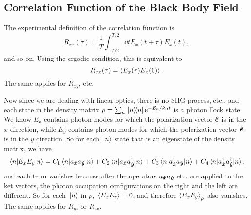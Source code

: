 \documentclass[hyperref, a4paper]{article}
\newcommand*{\ee}{\mathrm{e}}
\newcommand{\kB}{k_{\text{B}}}
\begin{document}
\subsection{Correlation Function of the Black Body Field}

The experimental definition of the correlation function is 
\begin{equation}
    R_{xx}(\tau) = \frac{1}{T} \int_{-T/2}^{T/2} \dd{t} E_x(t+\tau) E_x(t),
\end{equation}
and so on. 
Using the ergodic condition, this is equivalent to 
\begin{equation}
    R_{xx} (\tau) = \expval{E_x(\tau) E_x(0)}.
\end{equation}
The same applies for $R_{xy}$, etc. 

Now since we are dealing with linear optics, 
there is no SHG process, etc., 
and each state in the density matrix $\rho = \sum_n \dyad*{n}{n} \ee^{- E_n / \kB t}$
is a photon Fock state.
We know $E_x$ contains photon modes 
for which the polarization vector $\vu*{e}$ is in the $x$ direction,
while $E_y$ contains photon modes 
for which the polarization vector $\vu*{e}$ is in the $y$ direction.
So for each $\ket*{n}$ state that is an eigenstate of the density matrix, 
we have 
\[
    \expval{E_x E_y}{n} = C_1 \expval*{a_{\vu*{x}} a_{\vu*{y}}}{n} + 
    C_2 \expval*{a_{\vu*{x}} a^\dagger_{\vu*{y}}}{n} + 
    C_3 \expval*{a^\dagger_{\vu*{x}} a_{\vu*{y}}}{n} +
    C_4 \expval*{a^\dagger_{\vu*{x}} a^\dagger_{\vu*{y}}}{n},
\]
and each term vanishes because 
after the operators $a_{\vu*{x}} a_{\vu*{y}}$ etc. are applied to the ket vectors, 
the photon occupation configurations on the right and the left are different.
So for each $\ket*{n}$ in $\rho$,
$\expval*{E_x E_y} = 0$,
and therefore $\expval{E_x E_y}_\rho$ also vanishes. 
The same applies for $R_{yz}$ or $R_{zx}$.
\end{document}
